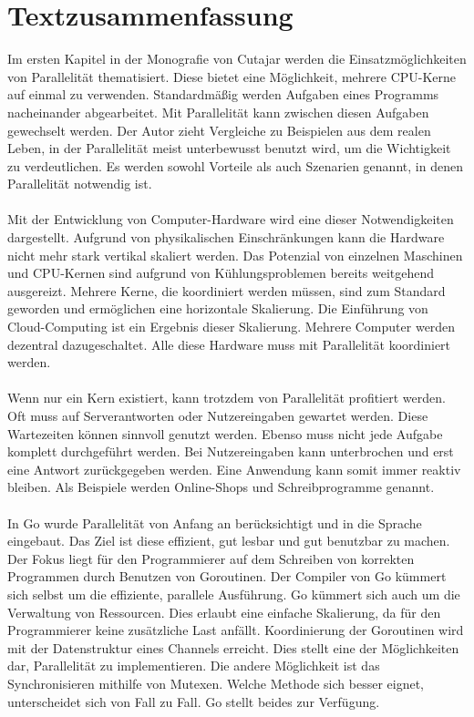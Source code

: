 \makeatletter\@openrightfalse
\chapter{Textzusammenfassung}\label{ch:txt}
Im ersten Kapitel in der Monografie von Cutajar\cite{cutajar_learn_2024} werden die Einsatzmöglichkeiten von Parallelität thematisiert. Diese bietet eine Möglichkeit, mehrere CPU-Kerne auf einmal zu verwenden. Standardmäßig werden Aufgaben eines Programms nach\-einander ab\-gearbeitet. Mit Parallelität kann zwischen diesen Aufgaben gewechselt werden. Der Autor zieht Vergleiche zu Beispielen aus dem realen Leben, in der Parallelität meist unter\-bewusst benutzt wird, um die Wichtigkeit zu verdeutlichen. Es werden sowohl Vorteile als auch Szenarien genannt, in denen Parallelität notwendig ist.\cite{cutajar_learn_2024}
\\
\\ Mit der Entwicklung von Computer-Hardware wird eine dieser Notwendigkeiten dargestellt. Aufgrund von physikalischen Einschränkungen kann die Hardware nicht mehr stark vertikal skaliert werden. Das Potenzial von einzelnen Maschinen und CPU-Kernen sind aufgrund von Kühlungsproblemen bereits weitgehend ausgereizt. Mehrere Kerne, die koordiniert werden müssen, sind zum Standard geworden und ermöglichen eine horizontale\- Skalierung. Die Einführung von Cloud-Computing ist ein Ergebnis dieser Skalierung. Mehrere Computer werden dezentral dazugeschaltet. Alle diese Hardware muss mit Parallelität koordiniert werden. \cite{cutajar_learn_2024}
\\
\\Wenn nur ein Kern existiert, kann trotzdem von Parallelität profitiert werden. Oft muss auf Serverantworten oder Nutzereingaben gewartet werden. Diese Wartezeiten können sinnvoll genutzt werden. Ebenso muss nicht jede Aufgabe komplett durchgeführt werden. Bei Nutzereingaben kann unterbrochen und erst eine Antwort zurückgegeben werden. Eine Anwendung kann somit immer reaktiv bleiben. Als Beispiele werden Online-Shops und Schreibprogramme genannt. \cite{cutajar_learn_2024}
\\
\\In Go wurde Parallelität von Anfang an berücksichtigt und in die Sprache eingebaut. Das Ziel ist diese effizient, gut lesbar und gut benutzbar zu machen. Der Fokus liegt für den Programmierer auf dem Schreiben von korrekten Programmen durch Benutzen von Goroutinen. Der Compiler von Go kümmert sich selbst um die effiziente, parallele Ausführung. Go kümmert sich auch um die Verwaltung von Ressourcen. Dies erlaubt eine einfache Skalierung, da für den Programmierer keine zusätzliche Last anfällt. Koor\-dinierung der Goroutinen wird mit der Datenstruktur eines Channels erreicht. Dies stellt eine der Möglichkeiten dar, Parallelität zu implementieren. Die andere Möglichkeit ist das Synchronisieren mithilfe von Mutexen. Welche Methode sich besser eignet, unterscheidet sich von Fall zu Fall. Go stellt beides zur Verfügung.\cite{cutajar_learn_2024}
\@openrighttrue\makeatother 
